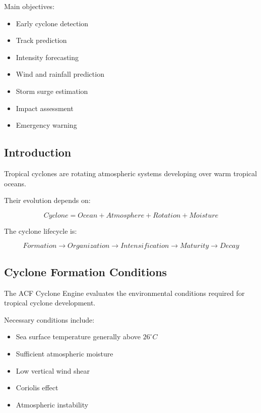 Main objectives:

\begin{itemize}

\item Early cyclone detection

\item Track prediction

\item Intensity forecasting

\item Wind and rainfall prediction

\item Storm surge estimation

\item Impact assessment

\item Emergency warning

\end{itemize}



\subsection{Introduction}

Tropical cyclones are rotating atmospheric systems developing over
warm tropical oceans.

Their evolution depends on:

\[
Cyclone =
Ocean
+
Atmosphere
+
Rotation
+
Moisture
\]


The cyclone lifecycle is:

\[
Formation
\rightarrow
Organization
\rightarrow
Intensification
\rightarrow
Maturity
\rightarrow
Decay
\]



\subsection{Cyclone Formation Conditions}

The ACF Cyclone Engine evaluates the environmental conditions required
for tropical cyclone development.

Necessary conditions include:

\begin{itemize}

\item Sea surface temperature generally above $26^\circ C$

\item Sufficient atmospheric moisture

\item Low vertical wind shear

\item Coriolis effect

\item Atmospheric instability

\end{itemize}


